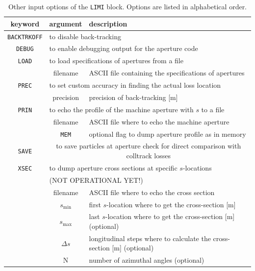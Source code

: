 \begin{center}
\begin{longtable}{|c|c|l|}%
    \caption{Other input options of the \texttt{LIMI} block. Options are listed in alphabetical order.}
    \label{tab:inpOptions} \\*
    \hline
    \rowcolor{blue!30}
    keyword & argument & description \\*
    \hline
    \endfirsthead

    \texttt{BACKTRKOFF} & \multicolumn{2}{l|}{to disable back-tracking} \\*
    \hline

    \texttt{DEBUG} & \multicolumn{2}{l|}{to enable debugging output for the aperture code} \\*
    \hline

    \texttt{LOAD}  & \multicolumn{2}{l|}{to load specifications of apertures from a file} \\*
                   & filename & ASCII file containing the specifications of apertures \\*
    \hline

    \texttt{PREC}  & \multicolumn{2}{l|}{to set custom accuracy in finding the actual loss location} \\*
                   & precision & precision of back-tracking [m] \\*
    \hline

    \texttt{PRIN}  & \multicolumn{2}{l|}{to echo the profile of the machine aperture with $s$ to a file} \\*
                   & filename & ASCII file where to echo the machine aperture \\*
                   & \texttt{MEM} & optional flag to dump aperture profile as in memory \\*
    \hline

    \texttt{SAVE}  & \multicolumn{2}{c|}{to save particles at aperture check for direct comparison with colltrack losses} \\*
    \hline

    \texttt{XSEC}  & \multicolumn{2}{l|}{to dump aperture cross sections at specific $s$-locations} \\*
                   & \multicolumn{2}{l|}{(NOT OPERATIONAL YET!)} \\*
                   & filename & ASCII file where to echo the cross section \\*
                   & $s_{\textrm{min}}$ & first $s$-location where to get the cross-section [m] \\*
                   & $s_{\textrm{max}}$ & last $s$-location where to get the cross-section [m] (optional) \\*
                   & $\Delta s$ & longitudinal steps where to calculate the cross-section [m] (optional) \\*
                   & N & number of azimuthal angles (optional) \\*
    \hline


\end{longtable}
\end{center}
